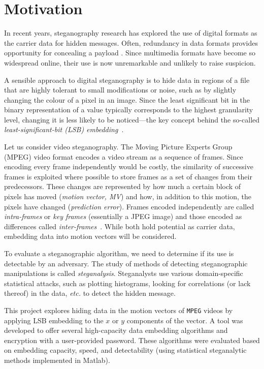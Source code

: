\documentclass[12pt,british,twoside,notitlepage,usenames,dvipsnames,hypens,final]{report}
\numberwithin{equation}{section}
\numberwithin{figure}{section}
\begin{document}
\section{Motivation}
\label{motivation}

In recent years, steganography research has explored the use of digital formats as the carrier data for hidden messages. Often, redundancy in data formats provides opportunity for concealing a payload \cite[p.~2]{fridrich}. Since multimedia formats have become so widespread online, their use is now unremarkable and unlikely to raise suspicion.

A sensible approach to digital steganography is to hide data in regions of a file that are highly tolerant to small modifications or noise, such as by slightly changing the colour of a pixel in an image. Since the least significant bit in the binary representation of a value typically corresponds to the highest granularity level, changing it is less likely to be noticed---the key concept behind the so-called \emph{least-significant-bit (LSB) embedding}~\cite{bateman}\label{lsb-steg}. 

Let us consider video steganography. The Moving Picture Experts Group (MPEG) video format encodes a video stream as a sequence of frames. Since encoding every frame independently would be costly, the similarity of successive frames is exploited where possible to store frames as a set of changes from their predecessors. These changes are represented by how much a certain block of pixels has moved (\emph{motion vector, MV}) and how, in addition to this motion, the pixels have changed (\emph{prediction error}). Frames encoded independently are called \emph{intra-frames} or \emph{key frames} (essentially a JPEG image) and those encoded as differences called \emph{inter-frames}~\cite{h264-std}. While both hold potential as carrier data, embedding data into motion vectors will be considered.

To evaluate a steganographic algorithm, we need to determine if its use is detectable by an adversary. The study of methods of detecting steganographic manipulations is called \emph{steganalysis}. Steganalysts use various domain-specific statistical attacks, such as plotting histograms, looking for correlations (or lack thereof) in the data, \emph{etc.} to detect the hidden message.

This project explores hiding data in the motion vectors of \texttt{MPEG} videos by applying LSB embedding to the $x$ or $y$ components of the vector. A tool was developed to offer several high-capacity data embedding algorithms and encryption with a user-provided password. These algorithms were evaluated based on embedding capacity, speed, and detectability (using statistical steganalytic methods implemented in Matlab).
\end{document}
